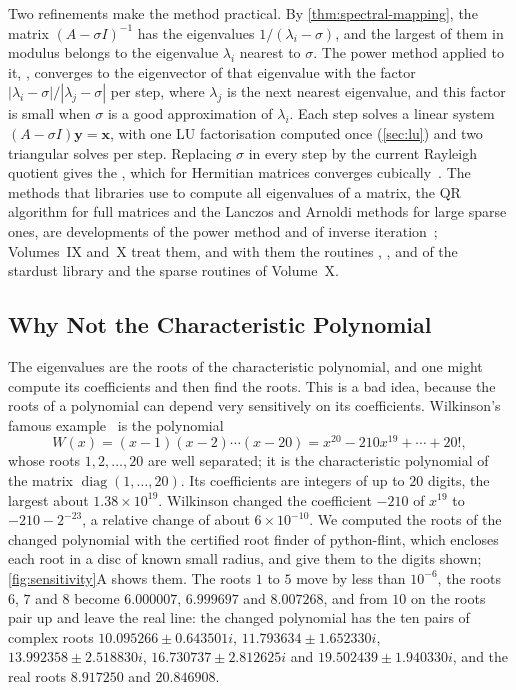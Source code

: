 Two refinements make the method practical. By \cref{thm:spectral-mapping}, the matrix $(A-\sigma I)^{-1}$ has the eigenvalues $1/(\lambda_i-\sigma)$, and the largest of them in modulus belongs to the eigenvalue $\lambda_i$ nearest to $\sigma$. The power method applied to it, , converges to the eigenvector of that eigenvalue with the factor $|\lambda_i-\sigma|/|\lambda_j-\sigma|$ per step, where $\lambda_j$ is the next nearest eigenvalue, and this factor is small when $\sigma$ is a good approximation of $\lambda_i$. Each step solves a linear system $(A-\sigma I)\mathbf y=\mathbf x$, with one LU factorisation computed once (\cref{sec:lu}) and two triangular solves per step. Replacing $\sigma$ in every step by the current Rayleigh quotient gives the , which for Hermitian matrices converges cubically~\cite{parlett1998}. The methods that libraries use to compute all eigenvalues of a matrix, the QR algorithm for full matrices and the Lanczos and Arnoldi methods for large sparse ones, are developments of the power method and of inverse iteration~\cite{golub2013,trefethen1997}; Volumes~IX and~X treat them, and with them the routines , ,  and  of the stardust library and the sparse routines of Volume~X.

\subsection{Why Not the Characteristic Polynomial}

The eigenvalues are the roots of the characteristic polynomial, and one might compute its coefficients and then find the roots. This is a bad idea, because the roots of a polynomial can depend very sensitively on its coefficients. Wilkinson's famous example~\cite{wilkinson1959,wilkinson1965} is the polynomial
\[
W(x)=(x-1)(x-2)\cdots(x-20)=x^{20}-210x^{19}+\cdots+20!,
\]
whose roots $1,2,\ldots,20$ are well separated; it is the characteristic polynomial of the matrix $\operatorname{diag}(1,\ldots,20)$. Its coefficients are integers of up to $20$ digits, the largest about $1.38\times10^{19}$. Wilkinson changed the coefficient $-210$ of $x^{19}$ to $-210-2^{-23}$, a relative change of about $6\times10^{-10}$. We computed the roots of the changed polynomial with the certified root finder of python-flint, which encloses each root in a disc of known small radius, and give them to the digits shown; \cref{fig:sensitivity}A shows them. The roots $1$ to $5$ move by less than $10^{-6}$, the roots $6$, $7$ and $8$ become $6.000007$, $6.999697$ and $8.007268$, and from $10$ on the roots pair up and leave the real line: the changed polynomial has the ten pairs of complex roots $10.095266\pm0.643501i$, $11.793634\pm1.652330i$, $13.992358\pm2.518830i$, $16.730737\pm2.812625i$ and $19.502439\pm1.940330i$, and the real roots $8.917250$ and $20.846908$.

